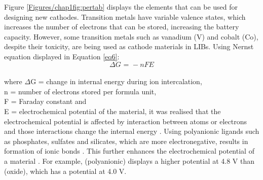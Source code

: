 Figure \ref{Figures/chap1fig:pertab} displays the elements that can be used for designing new cathodes. Transition metals have variable valence states, which increases the number of electrons that can be stored, increasing the battery capacity. However, some transition metals such as vanadium (V) and cobalt (Co), despite their toxicity, are being used as cathode materials in LIBs.
Using Nernst equation displayed in Equation \ref{eq6}:
\begin{equation} \label{eq6}
    \Delta G \text{ = } -nFE
\end{equation}\\
where $\Delta$G = change in internal energy during ion intercalation,\\
n = number of electrons stored per formula unit,\\
F = Faraday constant and\\
E = electrochemical potential of the material, it was realised that the electrochemical potential is affected by interaction between atoms or electrons and those interactions change the internal energy \cite{liu_understanding_2016}. Using polyanionic ligands such as phosphates, sulfates and silicates, which are more electronegative, results in formation of ionic bonds \cite{liu_understanding_2016}. This further enhances the electrochemical potential of a material \cite{melot_design_2013}. For example,  (polyanionic) displays a higher potential at 4.8 V than  (oxide), which has a potential at 4.0 V\cite{masquelier_polyanionic_2013}. 

